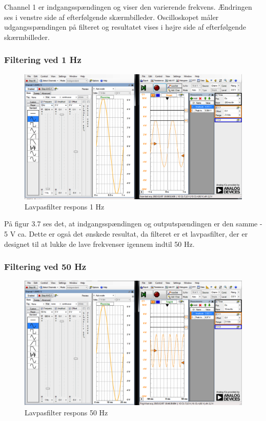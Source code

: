 Channel 1 er indgangsspændingen og viser den varierende frekvens. Ændringen ses i venstre side af efterfølgende skærmbilleder. 
Oscilloskopet måler udgangsspændingen på filteret og resultatet vises i højre side af efterfølgende skærmbilleder.

\subsubsection{Filtering ved 1 Hz}
\begin{figure}[H]
	\centering
	\includegraphics[width=1\textwidth]{Figurer/Snip20151207_39}
	\caption{Lavpasfilter respons 1 Hz}
	\label{fig:Filter}
\end{figure}

På figur 3.7 ses det, at indgangsspændingen  og outputspændingen er den samme - 5 V ca. Dette er også det ønskede resultat, da filteret er et lavpasfilter, der er designet til at lukke de lave frekvenser igennem indtil 50 Hz. 
 
\subsubsection{Filtering ved 50 Hz}
\begin{figure}[H]
	\centering
	\includegraphics[width=1\textwidth]{Figurer/Snip20151207_40}
	\caption{Lavpasfilter respons 50 Hz}
	\label{fig:Filter}
\end{figure}


